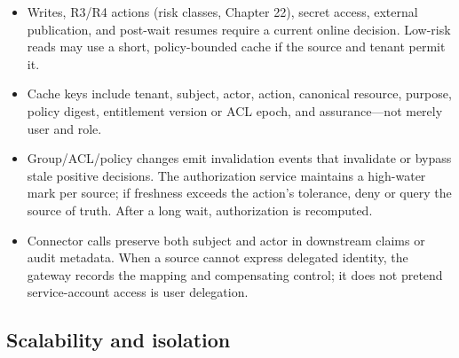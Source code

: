 \begin{itemize}

\item Writes, R3/R4 actions (risk classes, Chapter 22), secret access, external publication, and post-wait resumes require a current online decision. Low-risk reads may use a short, policy-bounded cache if the source and tenant permit it.

\item Cache keys include tenant, subject, actor, action, canonical resource, purpose, policy digest, entitlement version or ACL epoch, and assurance—not merely user and role.

\item Group/ACL/policy changes emit invalidation events that invalidate or bypass stale positive decisions. The authorization service maintains a high-water mark per source; if freshness exceeds the action’s tolerance, deny or query the source of truth. After a long wait, authorization is recomputed.

\item Connector calls preserve both subject and actor in downstream claims or audit metadata. When a source cannot express delegated identity, the gateway records the mapping and compensating control; it does not pretend service-account access is user delegation.

\end{itemize}

\subsection{Scalability and isolation}

